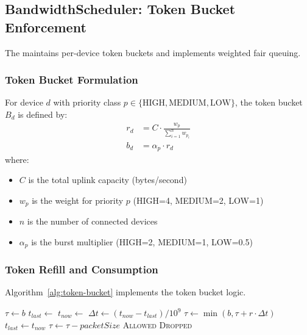 \subsection{BandwidthScheduler: Token Bucket Enforcement}

The  maintains per-device token buckets and implements weighted fair queuing.

\subsubsection{Token Bucket Formulation}

\begin{definition}
For device $d$ with priority class $p \in \{\text{HIGH}, \text{MEDIUM}, \text{LOW}\}$, the token bucket $B_d$ is defined by:
\begin{align}
r_d &= C \cdot \frac{w_p}{\sum_{i=1}^{n} w_{p_i}} \label{eq:rate} \\
b_d &= \alpha_p \cdot r_d \label{eq:burst}
\end{align}
where:
\begin{itemize}
    \item $C$ is the total uplink capacity (bytes/second)
    \item $w_p$ is the weight for priority $p$ (HIGH=4, MEDIUM=2, LOW=1)
    \item $n$ is the number of connected devices
    \item $\alpha_p$ is the burst multiplier (HIGH=2, MEDIUM=1, LOW=0.5)
\end{itemize}
\end{definition}

\subsubsection{Token Refill and Consumption}

Algorithm~\ref{alg:token-bucket} implements the token bucket logic.

\begin{algorithm}[htbp]
\caption{Token Bucket Operations}
\label{alg:token-bucket}
\begin{algorithmic}[1]
\State $\tau \gets b$ 
\State $t_{last} \gets$ 
    \State $t_{now} \gets$ 
    \State $\Delta t \gets (t_{now} - t_{last}) / 10^9$ 
    \State $\tau \gets \min(b, \tau + r \cdot \Delta t)$
    \State $t_{last} \gets t_{now}$
\EndProcedure
{}
    \State {}
        \State $\tau \gets \tau - packetSize$
        \State \Return \textsc{Allowed}
    \Else
        \State \Return \textsc{Dropped}
    \EndIf
\EndProcedure
\end{algorithmic}
\end{algorithm}

